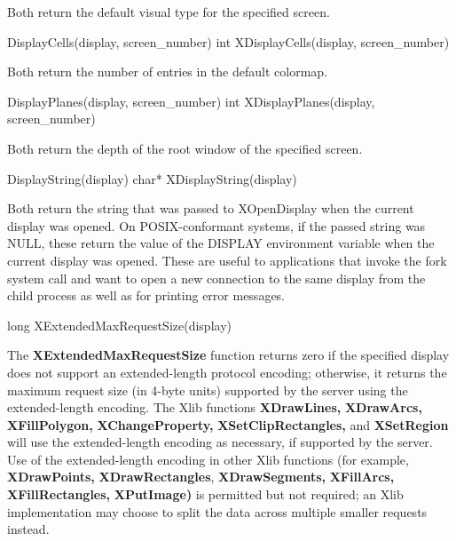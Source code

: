 \documentclass{report}
\begin{document}
\begin{itemize}
            Both return the default visual type for the specified screen.
            \bigbreak \noindent 
            \begin{cppcode}
            DisplayCells(display, screen_number)
            int XDisplayCells(display, screen_number)
            \end{cppcode}
            \bigbreak \noindent 
            Both return the number of entries in the default colormap.
            \bigbreak \noindent 
            \begin{cppcode}
            DisplayPlanes(display, screen_number)
            int XDisplayPlanes(display, screen_number)
            \end{cppcode}
            \bigbreak \noindent 
            Both return the depth of the root window of the specified screen.
            \bigbreak \noindent 
            \begin{cppcode}
            DisplayString(display)
            char* XDisplayString(display)
            \end{cppcode}
            \bigbreak \noindent 
            Both return the string that was passed to XOpenDisplay when the current display was opened. On POSIX-conformant systems, if the passed string was NULL, these return the value of the DISPLAY environment variable when the current display was opened. These are useful to applications that invoke the fork system call and want to open a new connection to the same display from the child process as well as for printing error messages.
            \bigbreak \noindent 
            \begin{cppcode}
            long XExtendedMaxRequestSize(display)
            \end{cppcode}
            \bigbreak \noindent 
            The \textbf{XExtendedMaxRequestSize} function returns zero if the specified display does not support an extended-length protocol encoding; otherwise, it returns the maximum request size (in 4-byte units) supported by the server using the extended-length encoding. The Xlib functions \textbf{XDrawLines,} \textbf{XDrawArcs,} \textbf{XFillPolygon,} \textbf{XChangeProperty,} \textbf{XSetClipRectangles,} and \textbf{XSetRegion} will use the extended-length encoding as necessary, if supported by the server. Use of the extended-length encoding in other Xlib functions (for example, \textbf{XDrawPoints,} \textbf{XDrawRectangles}, \textbf{XDrawSegments,} \textbf{XFillArcs,} \textbf{XFillRectangles,} \textbf{XPutImage)} is permitted but not required; an Xlib implementation may choose to split the data across multiple smaller requests instead.

\end{itemize}
\end{document}
